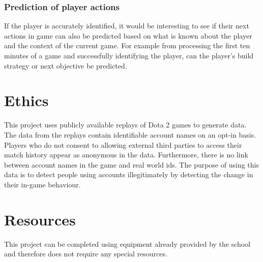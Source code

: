 \documentclass{sty/SizheArticle}
\newcommand{\dota}{Dota 2}
\begin{document}
\subsubsection{Prediction of player actions}\label{player-actions}
If the player is accurately identified, it would be interesting to see if their next actions in game can also be predicted based on what is known about the player and the context of the current game. For example from processing the first ten minutes of a game and successfully identifying the player, can the player's build strategy or next objective be predicted.

\section{Ethics}
This project uses publicly available replays of \dota{} games to generate data. The data from the replays contain identifiable account names on an opt-in basis. Players who do not consent to allowing external third parties to access their match history appear as anonymous in the data. Furthermore, there is no link between account names in the game and real world ids. The purpose of using this data is to detect people using accounts illegitimately by detecting the change in their in-game behaviour. 

\section{Resources}
This project can be completed using equipment already provided by the school and therefore does not require any special resources.
\end{document}

